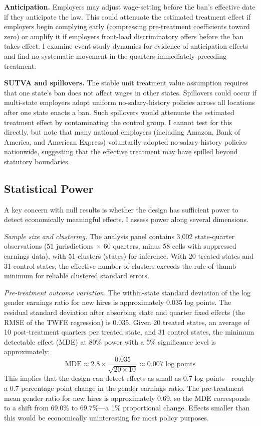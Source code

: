 \documentclass[12pt]{article}
\begin{document}
\textbf{Anticipation.} Employers may adjust wage-setting before the ban's effective date if they anticipate the law. This could attenuate the estimated treatment effect if employers begin complying early (compressing pre-treatment coefficients toward zero) or amplify it if employers front-load discriminatory offers before the ban takes effect. I examine event-study dynamics for evidence of anticipation effects and find no systematic movement in the quarters immediately preceding treatment.

\textbf{SUTVA and spillovers.} The stable unit treatment value assumption requires that one state's ban does not affect wages in other states. Spillovers could occur if multi-state employers adopt uniform no-salary-history policies across all locations after one state enacts a ban. Such spillovers would attenuate the estimated treatment effect by contaminating the control group. I cannot test for this directly, but note that many national employers (including Amazon, Bank of America, and American Express) voluntarily adopted no-salary-history policies nationwide, suggesting that the effective treatment may have spilled beyond statutory boundaries.

\subsection{Statistical Power}

A key concern with null results is whether the design has sufficient power to detect economically meaningful effects. I assess power along several dimensions.

\textit{Sample size and clustering.} The analysis panel contains 3,002 state-quarter observations (51 jurisdictions $\times$ 60 quarters, minus 58 cells with suppressed earnings data), with 51 clusters (states) for inference. With 20 treated states and 31 control states, the effective number of clusters exceeds the rule-of-thumb minimum for reliable clustered standard errors.

\textit{Pre-treatment outcome variation.} The within-state standard deviation of the log gender earnings ratio for new hires is approximately 0.035 log points. The residual standard deviation after absorbing state and quarter fixed effects (the RMSE of the TWFE regression) is 0.035. Given 20 treated states, an average of 10 post-treatment quarters per treated state, and 31 control states, the minimum detectable effect (MDE) at 80\% power with a 5\% significance level is approximately:
\begin{equation}
  \text{MDE} \approx 2.8 \times \frac{0.035}{\sqrt{20 \times 10}} \approx 0.007 \text{ log points}
\end{equation}
This implies that the design can detect effects as small as 0.7 log points---roughly a 0.7 percentage point change in the gender earnings ratio. The pre-treatment mean gender ratio for new hires is approximately 0.69, so the MDE corresponds to a shift from 69.0\% to 69.7\%---a 1\% proportional change. Effects smaller than this would be economically uninteresting for most policy purposes.
\end{document}

